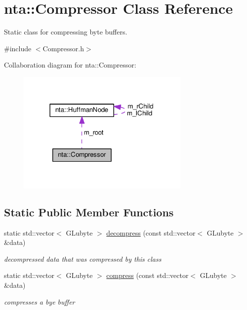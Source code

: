 \hypertarget{classnta_1_1Compressor}{}\section{nta\+:\+:Compressor Class Reference}
\label{classnta_1_1Compressor}


Static class for compressing byte buffers.  




{\ttfamily \#include $<$Compressor.\+h$>$}



Collaboration diagram for nta\+:\+:Compressor\+:
\nopagebreak
\begin{figure}[H]
\begin{center}
\leavevmode
\includegraphics[width=238pt]{d6/deb/classnta_1_1Compressor__coll__graph}
\end{center}
\end{figure}
\subsection*{Static Public Member Functions}
\begin{DoxyCompactItemize}
\item 
\mbox{\label{classnta_1_1Compressor_aaf2c8b87946d2cee8b4edcf4c48f7f71}} 
static std\+::vector$<$ G\+Lubyte $>$ \hyperlink{classnta_1_1Compressor_aaf2c8b87946d2cee8b4edcf4c48f7f71}{decompress} (const std\+::vector$<$ G\+Lubyte $>$ \&data)
\begin{DoxyCompactList}\small\item\em decompressed data that was compressed by this class \end{DoxyCompactList}\item 
\mbox{\label{classnta_1_1Compressor_ac5f5822b598309d4ef6a89edb7bdcf10}} 
static std\+::vector$<$ G\+Lubyte $>$ \hyperlink{classnta_1_1Compressor_ac5f5822b598309d4ef6a89edb7bdcf10}{compress} (const std\+::vector$<$ G\+Lubyte $>$ \&data)
\begin{DoxyCompactList}\small\item\em compresses a bye buffer \end{DoxyCompactList}\end{DoxyCompactItemize}
